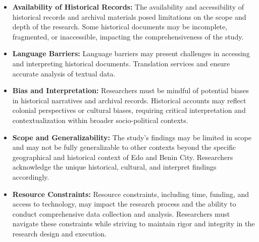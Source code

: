 \begin{itemize}
    \item \textbf{Availability of Historical Records:} The availability and accessibility of historical records and archival materials posed limitations on the scope and depth of the research. Some historical documents may be incomplete, fragmented, or inaccessible, impacting the comprehensiveness of the study.
    
    \item \textbf{Language Barriers:} Language barriers may present challenges in accessing and interpreting historical documents. Translation services and ensure accurate analysis of textual data.
    
    \item \textbf{Bias and Interpretation:} Researchers must be mindful of potential biases in historical narratives and archival records. Historical accounts may reflect colonial perspectives or cultural biases, requiring critical interpretation and contextualization within broader socio-political contexts.
    
    \item \textbf{Scope and Generalizability:} The study's findings may be limited in scope and may not be fully generalizable to other contexts beyond the specific geographical and historical context of Edo and Benin City. Researchers acknowledge the unique historical, cultural, and interpret findings accordingly.
    
    \item \textbf{Resource Constraints:} Resource constraints, including time, funding, and access to technology, may impact the research process and the ability to conduct comprehensive data collection and analysis. Researchers must navigate these constraints while striving to maintain rigor and integrity in the research design and execution.
\end{itemize}



